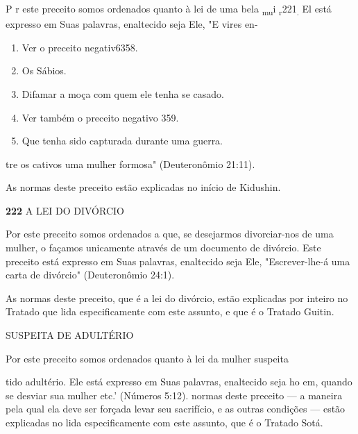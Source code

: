 P r este preceito somos ordenados quanto à lei de uma bela
\textsubscript{mu}i \textsubscript{r}221\textsubscript{.} El está
expresso em Suas palavras, enaltecido seja Ele, "E vires en-


\begin{enumerate}
\def\labelenumi{\arabic{enumi}.}
\setcounter{enumi}{216}
\item
 
 Ver o preceito negativ6358.
 
\item
 
 Os Sábios.
 
\item
 
 Difamar a moça com quem ele tenha se casado.
 
\item
 
 Ver também o preceito negativo 359.
 
\item
 
 Que tenha sido capturada durante uma guerra.
 
\end{enumerate}




tre os cativos uma mulher formosa" (Deuteronômio 21:11).


As normas deste preceito estão explicadas no início de Kidushin.


\textbf{222} A LEI DO DIVÓRCIO

Por este preceito somos ordenados a que, se desejarmos divorciar-nos de
uma mulher, o façamos unicamente através de um documento de divór­cio.
Este preceito está expresso em Suas palavras, enaltecido seja Ele,
"Escrever-lhe-á uma carta de divórcio" (Deuteronômio 24:1).

As normas deste preceito, que é a lei do divórcio, estão explicadas por
inteiro no Tratado que lida especificamente com este assunto, e que é o
Tratado Guitin.


SUSPEITA DE ADULTÉRIO

Por este preceito somos ordenados quanto à lei da mulher suspeita

tido adultério. Ele está expresso em Suas palavras, enaltecido seja ho
em, quando se desviar sua mulher etc.' (Números 5:12). normas deste
preceito --- a maneira pela qual ela deve ser forçada levar seu
sacrifício, e as outras condições --- estão explicadas no lida
especificamente com este assunto, que é o Tratado Sotá.


